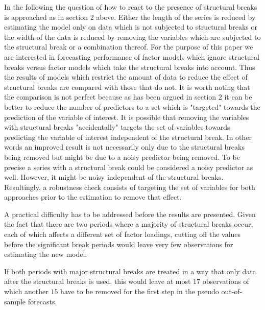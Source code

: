 \documentclass[11pt]{article}
\begin{document}
In the following the question of how to react to the presence of structural breaks is approached as in section 2 above. Either the length of the series is reduced by estimating the model only on data which is not subjected to structural breaks or the width of the data is reduced by removing the variables which are subjected to the structural break or a combination thereof. For the purpose of this paper we are interested in forecasting performance of factor models which ignore structural breaks versus factor models which take the structural breaks into account. Thus the results of models which restrict the amount of data to reduce the effect of structural breaks are compared with those that do not. It is worth noting that the comparison is not perfect because as has been argued in section $2$ it can be better to reduce the number of predictors to a set which is "targeted" towards the prediction of the variable of interest. It is possible that removing the variables with structural breaks "accidentally" targets the set of variables towards predicting the variable of interest independent of the structural break. In other words an improved result is not necessarily only due to the structural breaks being removed but might be due to a noisy predictor being removed. To be precise a series with a structural break could be considered a noisy predictor as well. However, it might be noisy independent of the structural breaks.
Resultingly, a robustness check consists of targeting the set of variables for both approaches prior to the estimation to remove that effect.

A practical difficulty has to be addressed before the results are presented. Given the fact that there are two periods where a majority of structural breaks occur, each of which affects a different set of factor loadings, cutting off the values before the significant break periods would leave very few observations for estimating the new model.

If both periods with major structural breaks are treated in a way that only data after the structural breaks is used, this would leave at most $17$ observations of which another $15$ have to be removed for the first step in the pseudo out-of-sample forecasts.
\end{document}
